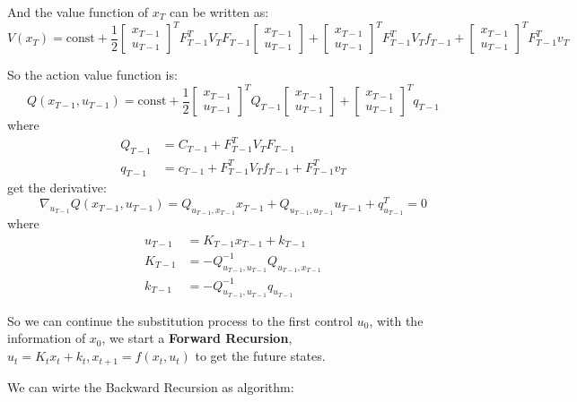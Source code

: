 \documentclass[10pt]{elegantbook}
\begin{document}
And the value function of $x_T$ can be written as:
\[ 
V(x_T) = \text{const} + \frac{1}{2}
\begin{bmatrix}
x_{T-1} \\
u_{T-1}
\end{bmatrix}^T
F_{T-1}^T V_T F_{T-1}
\begin{bmatrix}
x_{T-1} \\
u_{T-1}
\end{bmatrix}
+ \begin{bmatrix}
x_{T-1} \\
u_{T-1}
\end{bmatrix}^T F_{T-1}^T V_T f_{T-1}
+ \begin{bmatrix}
x_{T-1} \\
u_{T-1}
\end{bmatrix}^T F_{T-1}^T v_T
\]

So the action value function is:
\[
Q(x_{T-1}, u_{T-1}) = \text{const} + \frac{1}{2}
\begin{bmatrix}
x_{T-1} \\
u_{T-1}
\end{bmatrix}^T
Q_{T-1}
\begin{bmatrix}
x_{T-1} \\
u_{T-1}
\end{bmatrix}
+ \begin{bmatrix}
x_{T-1} \\
u_{T-1}
\end{bmatrix}^T q_{T-1}
\]
where
\begin{align*}
Q_{T-1} &= C_{T-1} + F_{T-1}^T V_T F_{T-1} \\
q_{T-1} &= c_{T-1} + F_{T-1}^T V_T f_{T-1} + F_{T-1}^T v_T
\end{align*}
get the derivative:
\[
\nabla_{u_{T-1}} Q(x_{T-1}, u_{T-1}) =
Q_{u_{T-1}, x_{T-1}} x_{T-1} + Q_{u_{T-1}, u_{T-1}} u_{T-1} + q_{u_{T-1}}^T = 0
\]
where
\begin{align*}
u_{T-1} &= K_{T-1} x_{T-1} + k_{T-1} \\
K_{T-1} &= -Q_{u_{T-1}, u_{T-1}}^{-1} Q_{u_{T-1}, x_{T-1}} \\
k_{T-1} &= -Q_{u_{T-1}, u_{T-1}}^{-1} q_{u_{T-1}}
\end{align*}

So we can continue the substitution process to the first control $u_0$, with the information of $x_0$,
we start a \textbf{Forward Recursion}, $u_t = K_tx_t + k_t, x_{t+1} = f(x_t, u_t)$ to get the future states.

We can wirte the Backward Recursion as algorithm:
\end{document}
